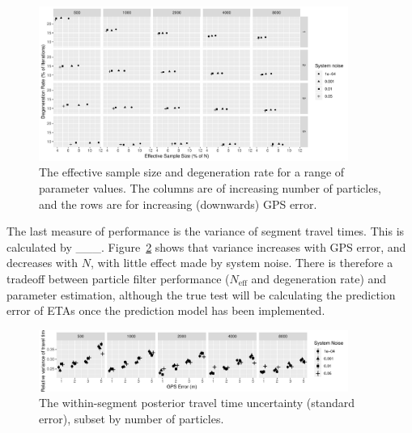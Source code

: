 \begin{figure}[tb]
    \centering
    \includegraphics[width=0.9\textwidth]{figures/04_model_results_degen.pdf}
    \caption{The effective sample size and degeneration rate for a range of parameter 
        values. The columns are of increasing number of particles,
        and the rows are for increasing (downwards) GPS error.}
    \label{fig:degen_rate}
\end{figure}


The last measure of performance is the variance of segment travel times.
This is calculated by \_\_\_.
Figure~\ref{fig:travel_times} shows that variance increases with GPS error,
and decreases with $N$,
with little effect made by system noise.
There is therefore a tradeoff between particle filter performance
($N_\text{eff}$ and degeneration rate) and parameter estimation,
although the true test will be calculating the prediction error
of ETAs once the prediction model has been implemented.


\begin{figure}[tb]
    \centering
    \includegraphics[width=0.9\textwidth]{figures/04_model_results_times.pdf}
    \caption{The within-segment posterior travel time uncertainty (standard error), subset by number of particles.}
    \label{fig:travel_times}
\end{figure}


